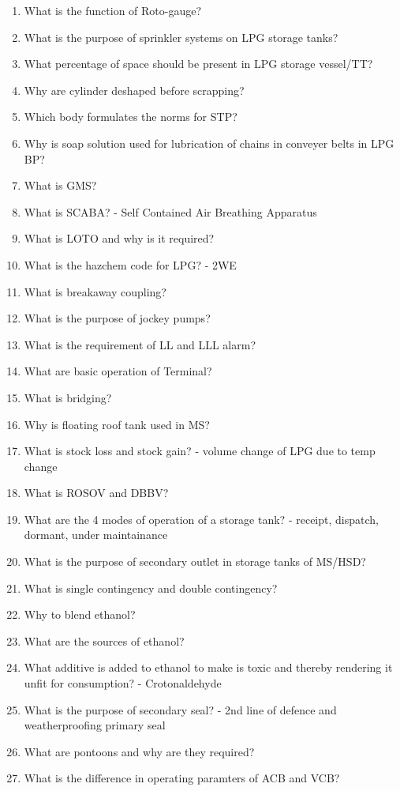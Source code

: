 \documentclass{report}
\begin{document}
\begin{enumerate}
		\item What is the function of Roto-gauge?
		\item What is the purpose of sprinkler systems on LPG storage tanks?
		\item What percentage of space should be present in LPG storage vessel/TT?
		\item Why are cylinder deshaped before scrapping?
		\item Which body formulates the norms for STP?
		\item Why is soap solution used for lubrication of chains in conveyer belts in LPG BP?
		\item What is GMS?
		\item What is SCABA? - Self Contained Air Breathing Apparatus
		\item What is LOTO and why is it required?
		\item What is the hazchem code for LPG? - 2WE
		\item What is breakaway coupling?
		\item What is the purpose of jockey pumps?
		\item What is the requirement of LL and LLL alarm?
		\item What are basic operation of Terminal?
		\item What is bridging?
		\item Why is floating roof tank used in MS?
		\item What is stock loss and stock gain? - volume change of LPG due to temp change
		\item What is ROSOV and DBBV?
		\item What are the 4 modes of operation of a storage tank? - receipt, dispatch, dormant, under maintainance 
		\item What is the purpose of secondary outlet in storage tanks of MS/HSD?
		\item What is single contingency and double contingency?
		\item Why to blend ethanol?
		\item What are the sources of ethanol?
		\item What additive is added to ethanol to make is toxic and thereby rendering it unfit for consumption? - Crotonaldehyde
		\item What is the purpose of secondary seal? - 2nd line of defence and weatherproofing primary seal
		\item What are pontoons and why are they required?
		\item What is the difference in operating paramters of ACB and VCB?

\end{enumerate}
\end{document}
